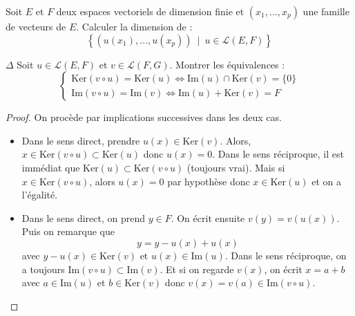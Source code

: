 \documentclass[french,a4paper]{article}
\renewcommand{\ker}{\text{Ker}}
\theoremstyle{plain}
\theoremstyle{definition}
\theoremstyle{remark}
\begin{document}
\begin{ex}[Moulin.34]{}
	Soit $E$ et $F$ deux espaces vectoriels de dimension finie et $(x_1,\ldots,x_p)$ une famille de vecteurs de $E$. Calculer la dimension de : $$\left\{(u(x_1),\ldots,u(x_p))\ \mid\ u\in\mathcal{L}(E,F)\right\}$$
\end{ex}

\begin{ex}[Moulin.35]{$\Delta$}
	Soit $u\in\mathcal{L}(E,F)$ et $v\in\mathcal{L}(F,G)$. Montrer les équivalences : $$\begin{cases}
		\ker(v\circ u)=\ker(u)\iff\text{Im}(u)\cap\ker(v)=\{0\} \\
		\text{Im}(v\circ u)=\text{Im}(v)\iff \text{Im}(u)+\ker(v)=F
	\end{cases}$$
\end{ex}
\begin{proof}
	On procède par implications successives dans les deux cas.
	\begin{itemize}
		\item Dans le sens direct, prendre $u(x)\in\ker(v)$. Alors, $x\in\ker(v\circ u)\subset\ker(u)$ donc $u(x)=0$. Dans le sens réciproque, il est immédiat que $\ker(u)\subset\ker(v\circ u)$ (toujours vrai). Mais si $x\in\ker(v\circ u)$, alors $u(x)=0$ par hypothèse donc $x\in\ker(u)$ et on a l'égalité.
		\item Dans le sens direct, on prend $y\in F$. On écrit ensuite $v(y)=v(u(x))$. Puis on remarque que $$y=y-u(x)+u(x)$$ avec $y-u(x)\in\ker(v)$ et $u(x)\in\text{Im}(u)$. Dans le sens réciproque, on a toujours $\text{Im}(v\circ u)\subset\text{Im}(v)$. Et si on regarde $v(x)$, on écrit $x=a+b$ avec $a\in\text{Im}(u)$ et $b\in\ker(v)$ donc $v(x)=v(a)\in\text{Im}(v\circ u)$.
	\end{itemize}
\end{proof}
\end{document}
